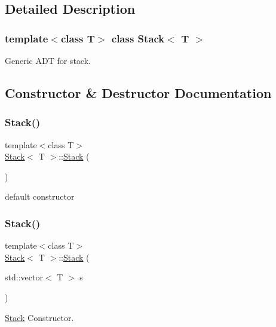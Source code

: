 \subsection{Detailed Description}
\subsubsection*{template$<$class T$>$\newline
class Stack$<$ T $>$}

Generic A\+DT for stack. 

\subsection{Constructor \& Destructor Documentation}
\mbox{\label{class_stack_aefee698059467258bbd79045aca62a63}} 
\subsubsection{\texorpdfstring{Stack()}{Stack()}\hspace{0.1cm}{\footnotesize\ttfamily [1/2]}}
{\footnotesize\ttfamily template$<$class T$>$ \\
\hyperlink{class_stack}{Stack}$<$ T $>$\+::\hyperlink{class_stack}{Stack} (\begin{DoxyParamCaption}{ }\end{DoxyParamCaption})}

default constructor \mbox{\label{class_stack_acf1a315995090bf9cf957ac84175c82c}} 
\subsubsection{\texorpdfstring{Stack()}{Stack()}\hspace{0.1cm}{\footnotesize\ttfamily [2/2]}}
{\footnotesize\ttfamily template$<$class T$>$ \\
\hyperlink{class_stack}{Stack}$<$ T $>$\+::\hyperlink{class_stack}{Stack} (\begin{DoxyParamCaption}\item[{std\+::vector$<$ T $>$}]{s }\end{DoxyParamCaption})}



\hyperlink{class_stack}{Stack} Constructor. 


